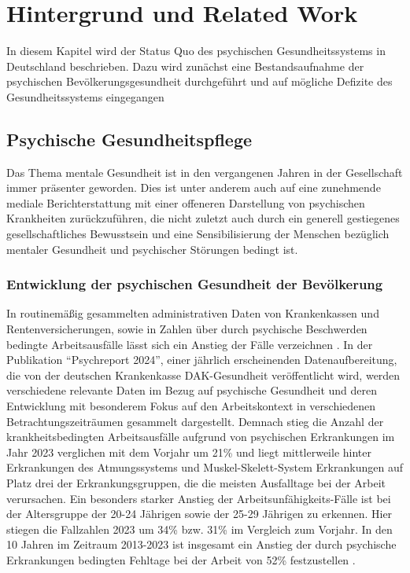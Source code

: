 \chapter{Hintergrund und Related Work}\label{sec:theoretischer_hintergrund}

In diesem Kapitel wird der Status Quo des psychischen Gesundheitssystems in Deutschland beschrieben. 
Dazu wird zunächst eine Bestandsaufnahme der psychischen Bevölkerungsgesundheit durchgeführt 
und auf mögliche Defizite des Gesundheitssystems eingegangen


\section{Psychische Gesundheitspflege}\label{subsec:psychische_gesundheitspflege}

Das Thema mentale Gesundheit ist in den vergangenen Jahren in der Gesellschaft immer präsenter geworden. 
Dies ist unter anderem auch auf eine zunehmende mediale Berichterstattung mit einer offeneren Darstellung von psychischen Krankheiten zurückzuführen, 
die nicht zuletzt auch durch ein generell gestiegenes gesellschaftliches Bewusstsein 
und eine Sensibilisierung der Menschen bezüglich mentaler Gesundheit und psychischer Störungen bedingt ist.

\subsection{Entwicklung der psychischen Gesundheit der Bevölkerung}\label{subsubsec:entwicklung_psychische_gesundheit}

In routinemäßig gesammelten administrativen Daten von Krankenkassen und Rentenversicherungen, 
sowie in Zahlen über durch psychische Beschwerden bedingte Arbeitsausfälle 
lässt sich ein Anstieg der Fälle verzeichnen 
\cite[]{arzteblatt_hochststand_2024,dak-gesundheit_entwicklungen_2024}. %
In der Publikation “Psychreport 2024”, einer jährlich erscheinenden Datenaufbereitung, 
die von der deutschen Krankenkasse DAK-Gesundheit veröffentlicht wird, 
werden verschiedene relevante Daten im Bezug auf psychische Gesundheit 
und deren Entwicklung mit besonderem Fokus auf den Arbeitskontext 
in verschiedenen Betrachtungszeiträumen gesammelt dargestellt. 
Demnach stieg die Anzahl der krankheitsbedingten Arbeitsausfälle 
aufgrund von psychischen Erkrankungen im Jahr 2023 verglichen mit dem Vorjahr um 21\% 
und liegt mittlerweile hinter Erkrankungen des Atmungssystems 
und Muskel-Skelett-System Erkrankungen auf Platz drei der Erkrankungsgruppen, 
die die meisten Ausfalltage bei der Arbeit verursachen.
Ein besonders starker Anstieg der Arbeitsunfähigkeits-Fälle ist bei der Altersgruppe der 20-24 Jährigen 
sowie der 25-29 Jährigen zu erkennen. Hier stiegen die Fallzahlen 2023 
um 34\% bzw. 31\% im Vergleich zum Vorjahr. 
In den 10 Jahren im Zeitraum 2013-2023 ist insgesamt ein Anstieg 
der durch psychische Erkrankungen bedingten Fehltage bei der Arbeit von 52\% festzustellen 
\cite[]{dak-gesundheit_entwicklungen_2024}. %

